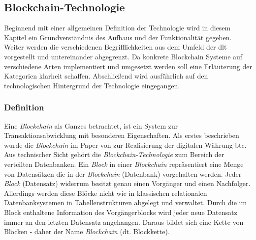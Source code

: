 \subsection{Blockchain-Technologie} \label{sec:blockchain-technology}
Beginnend mit einer allgemeinen Definition der Technologie wird in diesem Kapitel ein Grundverständnis des Aufbaus und der Funktionalität gegeben. Weiter werden die verschiedenen Begrifflichkeiten aus dem Umfeld der \acf{dlt} vorgestellt und untereinander abgegrenzt. Da konkrete Blockchain Systeme auf verschiedene Arten implementiert und umgesetzt werden soll eine Erläuterung der Kategorien klarheit schaffen. Abschließend wird ausführlich auf den technologischen Hintergrund der Technologie eingegangen.

\subsubsection{Definition} \label{blockchain-definition}
Eine \textit{Blockchain} als Ganzes betrachtet, ist ein System zur Transaktionsabwicklung mit besonderen Eigenschaften. Als erstes beschrieben wurde die \textit{Blockchain} im Paper von \cite{Nakamoto2009} zur Realisierung der digitalen Währung \ac{btc}. Aus technischer Sicht gehört die \textit{Blockchain-Technologie} zum Bereich der verteilten Datenbanken. Ein \textit{Block} in einer \textit{Blockchain} repräsentiert eine Menge von Datensätzen die in der \textit{Blockchain} (Datenbank) vorgehalten werden. Jeder \textit{Block} (Datensatz) widerrum besitzt genau einen Vorgänger und einen Nachfolger. Allerdings werden diese Blöcke nicht wie in klassischen relationalen Datenbanksystemen in Tabellenstrukturen abgelegt und verwaltet. Durch die im Block enthaltene Information des Vorgängerblocks wird jeder neue Datensatz immer an den letzten Datensatz angehangen. Daraus bildet sich eine Kette von Blöcken - daher der Name \textit{Blockchain} (dt. Blockkette).

